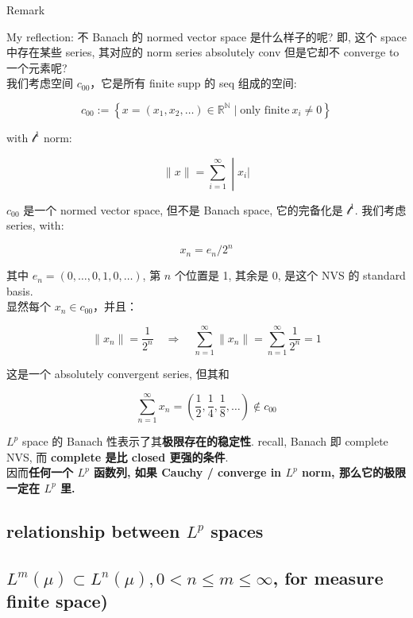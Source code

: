 \begin{qlremark}{Remark}

My reflection: 不 Banach 的 normed vector space 是什么样子的呢? 即, 这个 space 中存在某些 series, 其对应的 norm series absolutely conv 但是它却不 converge to 一个元素呢?\\
我们考虑空间 \(c_{00}\)，它是所有 finite supp 的 seq 组成的空间:

\[c_{00} := \left\{ {x = (x_{1},x_{2},\ldots) \in \mathbb{R}^{\mathbb{N}} \mid \text{only finite}\ x_{i} \neq 0} \right\}\]

with \(\mathcal{l}^{1}\) norm:

\[\left. \parallel x \parallel = \sum\limits_{i = 1}^{\infty} \middle| x_{i}| \right.\]

\(c_{00}\) 是一个 normed vector space, 但不是 Banach space, 它的完备化是 \(\mathcal{l}^{1}\). 我们考虑 series, with:

\[x_{n} = e_{n}/2^{n}\]

其中 \(e_{n} = (0,\ldots,0,1,0,\ldots)\), 第 \(n\) 个位置是 1, 其余是 \(0\), 是这个 NVS 的 standard basis.\\
显然每个 \(x_{n} \in c_{00}\)，并且：

\[\parallel x_{n} \parallel = \frac{1}{2^{n}}\quad\Rightarrow\quad\sum\limits_{n = 1}^{\infty} \parallel x_{n} \parallel = \sum\limits_{n = 1}^{\infty}\frac{1}{2^{n}} = 1\]

这是一个 absolutely convergent series, 但其和

\[\sum\limits_{n = 1}^{\infty}x_{n} = \left( {\frac{1}{2},\frac{1}{4},\frac{1}{8},\ldots} \right) \notin c_{00}\]

\(L^{p}\) space 的 Banach 性表示了其\textbf{极限存在的稳定性}. recall, Banach 即 complete NVS, 而 \textbf{complete 是比 closed 更强的条件}.\\
因而\textbf{任何一个 \(L^{p}\) 函数列, 如果 Cauchy / converge in \(L^{p}\) norm, 那么它的极限一定在 \(L^{p}\) 里.}

\end{qlremark}

\subsection{\texorpdfstring{relationship between \(L^{p}\) spaces}{relationship between L\^{}\{p\} spaces}}\label{relationship-between-lp-spaces}

\subsection{\texorpdfstring{\(L^{m}(\mu) \subset L^{n}(\mu),0 < n \leq m \leq \infty\), for measure finite space)}{L\^{}\{m\}(\textbackslash mu) \textbackslash subset L\^{}\{n\}(\textbackslash mu),0 \textless{} n \textbackslash leq m \textbackslash leq \textbackslash infty, for measure finite space)}}

